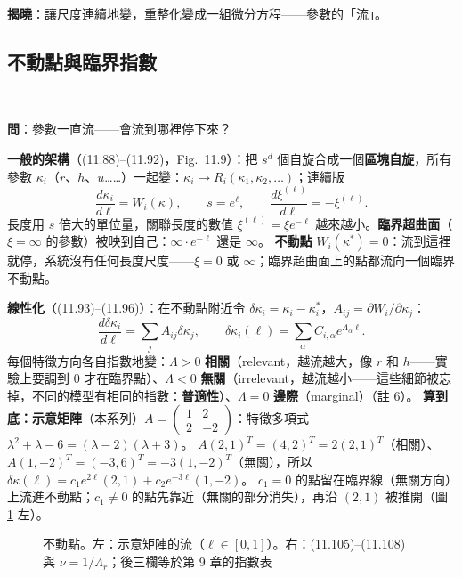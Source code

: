 \textbf{揭曉}：讓尺度連續地變，重整化變成一組微分方程——參數的「流」。

\subsection{不動點與臨界指數}
\leavevmode{}\ \par\nopagebreak

\textbf{問}：參數一直流——會流到哪裡停下來？

\textbf{一般的架構}（(11.88)--(11.92)，Fig.~11.9）：把 $s^d$ 個自旋合成一個\textbf{區塊自旋}，所有參數 $\kappa_i$（$r$、$h$、$u$……）一起變：$\kappa_i\to R_i(\kappa_1,\kappa_2,\ldots)$；連續版
\[\frac{d\kappa_i}{d\ell}=W_i(\kappa),\qquad s=e^\ell,\qquad\frac{d\xi^{(\ell)}}{d\ell}=-\xi^{(\ell)}.\tag{11.89--11.92}\]
長度用 $s$ 倍大的單位量，關聯長度的數值 $\xi^{(\ell)}=\xi e^{-\ell}$ 越來越小。\textbf{臨界超曲面}（$\xi=\infty$ 的參數）被映到自己：$\infty\cdot e^{-\ell}$ 還是 $\infty$。
\textbf{不動點} $W_i(\kappa^*)=0$：流到這裡就停，系統沒有任何長度尺度——$\xi=0$ 或 $\infty$；臨界超曲面上的點都流向一個臨界不動點。

\textbf{線性化}（(11.93)--(11.96)）：在不動點附近令 $\delta\kappa_i=\kappa_i-\kappa_i^*$，$A_{ij}=\partial W_i/\partial\kappa_j$：
\[\frac{d\delta\kappa_i}{d\ell}=\sum_jA_{ij}\delta\kappa_j,\qquad\delta\kappa_i(\ell)=\sum_\alpha C_{i,\alpha}e^{\Lambda_\alpha\ell}.\tag{11.94--11.95}\]
每個特徵方向各自指數地變：$\Lambda>0$ \textbf{相關}（relevant，越流越大，像 $r$ 和 $h$——實驗上要調到 0 才在臨界點）、$\Lambda<0$ \textbf{無關}（irrelevant，越流越小——這些細節被忘掉，不同的模型有相同的指數：\textbf{普適性}）、$\Lambda=0$ \textbf{邊際}（marginal）（註 6）。
\textbf{算到底：示意矩陣}（本系列）$A=\begin{pmatrix}1&2\\2&-2\end{pmatrix}$：特徵多項式 $\lambda^2+\lambda-6=(\lambda-2)(\lambda+3)$。
$A(2,1)^T=(4,2)^T=2(2,1)^T$（相關）、$A(1,-2)^T=(-3,6)^T=-3(1,-2)^T$（無關），所以 $\delta\kappa(\ell)=c_1e^{2\ell}(2,1)+c_2e^{-3\ell}(1,-2)$。
$c_1=0$ 的點留在臨界線（無關方向）上流進不動點；$c_1\ne0$ 的點先靠近（無關的部分消失），再沿 $(2,1)$ 被推開（圖 \ref{eleven-fig-fp} 左）。

\begin{figure}[htbp]
\centering
\begin{minipage}[c]{0.5\linewidth}\centering\ElevenFigToy\end{minipage}\hfill
\begin{minipage}[c]{0.48\linewidth}\centering\footnotesize\setlength{\tabcolsep}{3pt}\ElevenTabExp\end{minipage}
\caption{不動點。左：示意矩陣的流（$\ell\in[0,1]$）。右：(11.105)--(11.108) 與 $\nu=1/\Lambda_r$；後三欄等於第 9 章的指數表}\label{eleven-fig-fp}
\end{figure}

